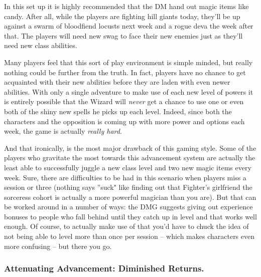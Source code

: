 In this set up it is highly recommended that the DM hand out magic items like candy. After all, while the players are fighting hill giants today, they'll be up against a swarm of bloodfiend locusts next week and a rogue deva the week after that. The players will need new swag to face their new enemies just as they'll need new class abilities.

Many players feel that this sort of play environment is simple minded, but really nothing could be further from the truth. In fact, players have no chance to get acquainted with their new abilities before they are laden with even newer abilities. With only a single adventure to make use of each new level of powers it is entirely possible that the Wizard will \textit{never} get a chance to use one or even both of the shiny new spells he picks up each level. Indeed, since both the characters and the opposition is coming up with more power and options each week, the game is actually \textit{really hard}.

And that ironically, is the most major drawback of this gaming style. Some of the players who gravitate the most towards this advancement system are actually the least able to successfully juggle a new class level and two new magic items every week. Sure, there are difficulties to be had in this scenario when players miss a session or three (nothing says ''suck" like finding out that Fighter's girlfriend the sorceress cohort is actually a more powerful magician than you are). But that can be worked around in a number of ways: the DMG suggests giving out experience bonuses to people who fall behind until they catch up in level and that works well enough. Of course, to actually make use of that you'd have to chuck the idea of not being able to level more than once per session -- which makes characters even more confusing -- but there you go.

\subsubsection{Attenuating Advancement: Diminished Returns.}
\vspace*{-8pt}


